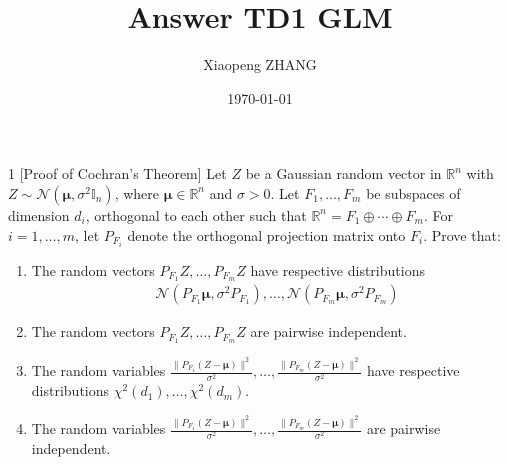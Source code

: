 \documentclass[a4paper, 12pt]{article}
\begin{document}
    \title{Answer TD1 GLM}
    \author{Xiaopeng ZHANG}
    \date{\today}
    \maketitle

    \begin{exercisebox}{1 [Proof of Cochran's Theorem]}
        Let $Z$ be a Gaussian random vector in $\mathbb{R}^n$ with $Z \sim \mathcal{N}(\boldsymbol{\mu}, \sigma^2\mathbb{I}_n)$, 
        where $\boldsymbol{\mu} \in \mathbb{R}^n$ and $\sigma > 0$. Let $F_1,\ldots,F_m$ be subspaces of dimension $d_i$, 
        orthogonal to each other such that $\mathbb{R}^n = F_1 \oplus \cdots \oplus F_m$. For $i=1,\ldots,m$, let $P_{F_i}$ denote the orthogonal projection matrix onto $F_i$. Prove that:

        \begin{enumerate}
            \item The random vectors $P_{F_1}Z,\ldots,P_{F_m}Z$ have respective distributions 
                \begin{align*}
                    &\mathcal{N}(P_{F_1}\boldsymbol{\mu},\sigma^2P_{F_1}),\ldots,\mathcal{N}(P_{F_m}\boldsymbol{\mu},\sigma^2P_{F_m})
                \end{align*}
            
            \item The random vectors $P_{F_1}Z,\ldots,P_{F_m}Z$ are pairwise independent.
            
            \item The random variables $\frac{\|P_{F_1}(Z-\boldsymbol{\mu})\|^2}{\sigma^2},\ldots,\frac{\|P_{F_m}(Z-\boldsymbol{\mu})\|^2}{\sigma^2}$ have respective distributions $\chi^2(d_1),\ldots,\chi^2(d_m)$.
            
            \item The random variables $\frac{\|P_{F_1}(Z-\boldsymbol{\mu})\|^2}{\sigma^2},\ldots,\frac{\|P_{F_m}(Z-\boldsymbol{\mu})\|^2}{\sigma^2}$ are pairwise independent.
        \end{enumerate}
    \end{exercisebox}
\end{document}
